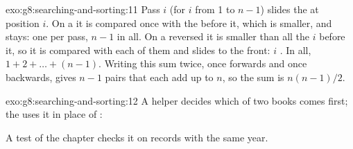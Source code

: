 \begin{solution}{exo:g8:searching-and-sorting:11}
Pass $i$ (for $i$ from 1 to $n - 1$) slides the  at position $i$. On a
 it is compared once with the  before it, which is smaller, and
stays: one  per pass, $n - 1$ in all. On a reversed  it is
smaller than all the $i$  before it, so it is compared with each of them
and slides to the front: $i$ . In all,
$1 + 2 + \dots + (n - 1)$. Writing this sum twice, once forwards and once
backwards, gives $n - 1$ pairs that each add up to $n$, so the sum is
$n(n-1)/2$.
\end{solution}

\begin{solution}{exo:g8:searching-and-sorting:12}
A helper  decides which of two books comes first; the 
uses it in place of \code{>}:

\label{lst:g8:searching-and-sorting:sol-books}

A test of the chapter checks it on records with the same year.
\end{solution}

